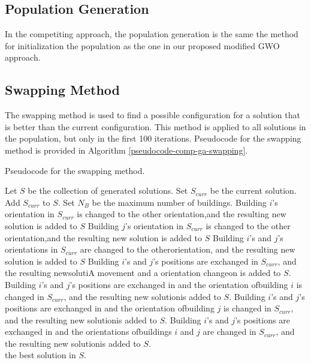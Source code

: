 \subsection{Population Generation}
In the competiting approach, the population generation is the same the method for initialization the population as the one in our proposed modified GWO approach.

\subsection{Swapping Method}
The swapping method is used to find a possible configuration for a solution that is better than the current configuration. This method is applied to all solutions in the population, but only in the first 100 iterations. Pseudocode for the swapping method is provided in Algorithm \ref{pseudocode-comp-ga-swapping}.

\begin{algorithm}
\caption{Pseudocode for the swapping method.}
\label{pseudocode-comp-ga-swapping}
\begin{algorithmic}[1]
\State Let $S$ be the collection of generated solutions.
\State Set $S_{curr}$ be the current solution.
\State Add $S_{curr}$ to $S$.
\State Set $N_{B}$ be the maximum number of buildings.
		\State Building $i$'s orientation in $S_{curr}$ is changed to the other orientation,\WRP and the resulting new solution is added to $S$
		\State Building $j$'s orientation in $S_{curr}$ is changed to the other orientation,\WRP and the resulting new solution is added to $S$
		\State Building $i$'s and $j$'s orientations in $S_{curr}$ are changed to the other\WRP orientation, and the resulting new solution is added to $S$
		\State Building $i$'s and $j$'s positions are exchanged in $S_{curr}$, and the resulting new\WRP solutiA movement and a orientation changeon is added to $S$.
		\State Building $i$'s and $j$'s positions are exchanged in and the orientation of\WRP building $i$ is changed in $S_{curr}$, and the resulting new solution\WRP is added to $S$.
		\State Building $i$'s and $j$'s positions are exchanged in and the orientation of\WRP building $j$ is changed in $S_{curr}$, and the resulting new solution\WRP is added to $S$.
		\State Building $i$'s and $j$'s positions are exchanged in and the orientations of\WRP buildings $i$ and $j$ are changed in $S_{curr}$, and the resulting new solution\WRP is added to $S$.
	\EndFor
\EndFor \\
\Return the best solution in $S$.
\end{algorithmic}
\end{algorithm}


